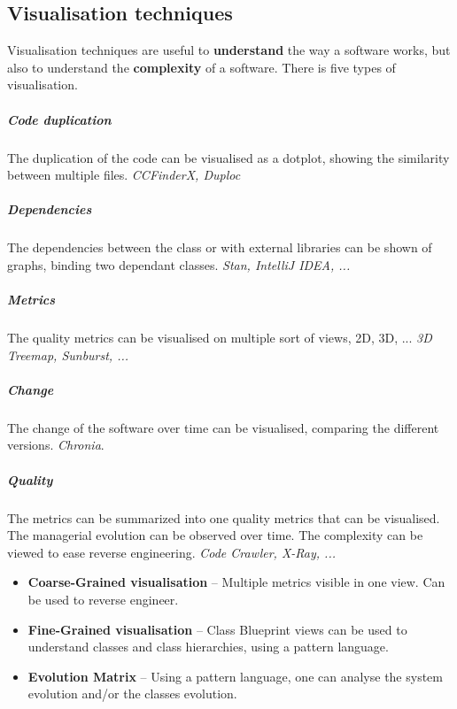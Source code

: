 \documentclass[a4paper,11pt]{report}
\begin{document}
	\subsection{Visualisation techniques}
		Visualisation techniques are useful to
			\textbf{understand} the way a
			software works, but also to understand
			the \textbf{complexity} of a software.
			There is five types of visualisation.
		\subparagraph{Code duplication}
			The duplication of the code can be 
			visualised as a dotplot, showing 
			the similarity between multiple
			files. \textit{CCFinderX, Duploc}
		\subparagraph{Dependencies}
			The dependencies between the class
			or with external libraries can
			be shown of graphs, binding 
			two dependant classes. \textit{Stan, 
			IntelliJ IDEA, ...}
		\subparagraph{Metrics}
			The quality metrics can be 
			visualised on multiple sort of
			views, 2D, 3D, ... \textit{3D Treemap,
			Sunburst, ...}
		\subparagraph{Change}
			The change of the software over time
			can be visualised, comparing the 
			different versions. \textit{Chronia}.	
		\subparagraph{Quality}
			The metrics can be summarized into 
			one quality metrics that can be visualised.
			The managerial evolution can be observed
			over time. The complexity can be 
			viewed to ease reverse engineering.
			\textit{Code Crawler, X-Ray, ...}
			\begin{itemize}
				\setlength{\itemsep}{0pt}		
				\setlength{\parskip}{0pt}		
				\setlength{\parsep}{0pt}	
				\item \textbf{Coarse-Grained
					visualisation} -- 	Multiple
					metrics visible in one view.
					Can be used to reverse engineer.
				\item \textbf{Fine-Grained 
					visualisation} -- Class 
					Blueprint views can be used
					to understand classes 
					and class hierarchies, using
					a pattern language.
				\item \textbf{Evolution Matrix} --
					Using a pattern language,
					one can analyse the system 
					evolution and/or the classes
					evolution.
			\end{itemize}
%
\end{document}
